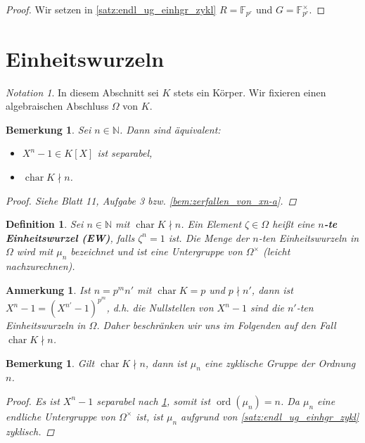 \documentclass[a4paper, twoside, 11pt, ngerman]{report}
\newcommand{\FF}{\mathds F}
\newcommand{\NN}{\mathds N}
\DeclareMathOperator{\charact}{char}
\DeclareMathOperator{\ord}{ord}
\theoremstyle{definistyle}
\newtheorem{defini}[satz]{Definition}
\newtheorem{bem}[satz]{Bemerkung}
\newtheorem{anm}[satz]{Anmerkung}
\theoremstyle{remark}
\newtheorem*{notation}{Notation}
\newcommand{\defn}[1]{\textit{\bfseries #1}}
\begin{document}
\begin{proof}
Wir setzen in \ref{satz:endl_ug_einhgr_zykl} $R = \FF_{p^r}$ und $G = \FF_{p^r}^\times$.
\end{proof}

\section{Einheitswurzeln}
\begin{notation}
In diesem Abschnitt sei $K$ stets ein Körper. Wir fixieren einen algebraischen Abschluss $\Omega$ von $K$.
\end{notation}

\begin{bem}\label{bem:separabilitaet_einheitswurzeln}
Sei $n \in \NN$. Dann sind äquivalent:
\begin{itemize}
    \item[(i)] $X^n - 1 \in K[X]$ ist separabel,
    \item[(ii)] $\charact K \nmid n$.
\end{itemize}
\begin{proof}
Siehe Blatt 11, Aufgabe 3 bzw. \ref{bem:zerfallen_von_xn-a}.
\end{proof}
\end{bem}

\begin{defini}\label{def:einheitswurzeln}
Sei $n \in \NN$ mit $\charact K \nmid n$. Ein Element $\zeta \in \Omega$ heißt eine \defn{$n$-te Einheitswurzel (EW)}, falls $\zeta^n = 1$ ist. Die Menge der $n$-ten Einheitswurzeln in $\Omega$ wird mit $\mu_n$ bezeichnet und ist eine Untergruppe von $\Omega^\times$ (leicht nachzurechnen).
\end{defini}

\begin{anm}
Ist $n = p^m n'$ mit $\charact K = p$ und $p\nmid n'$, dann ist $X^n - 1 = (X^{n'} - 1)^{p^m}$, d.h. die Nullstellen von $X^n - 1$ sind die $n'$-ten Einheitswurzeln in $\Omega$. Daher beschränken wir uns im Folgenden auf den Fall $\charact K \nmid n$.
\end{anm}

\begin{bem}\label{bem:struktur_einheitswurzeln}
Gilt $\charact K \nmid n$, dann ist $\mu_n$ eine zyklische Gruppe der Ordnung $n$.
\begin{proof}
Es ist $X^n - 1$ separabel nach \ref{bem:separabilitaet_einheitswurzeln}, somit ist $\ord(\mu_n) = n$. Da $\mu_n$ eine endliche Untergruppe von $\Omega^\times$ ist, ist $\mu_n$ aufgrund von \ref{satz:endl_ug_einhgr_zykl} zyklisch.
\end{proof}
\end{bem}
\end{document}
